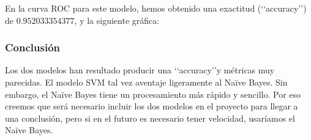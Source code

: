 En la curva ROC para este modelo, hemos obtenido
una exactitud (\lq\lq accuracy\rq\rq)
de $0.952033354377$, y la siguiente gráfica:


\subsubsection{Conclusión}

Los dos modelos han resultado producir una \lq\lq accuracy\rq\rq y métricas muy parecidas. El modelo SVM tal vez aventaje ligeramente al Naïve Bayes. Sin embargo, el Naïve Bayes tiene un procesamiento más rápido y sencillo. Por eso creemos que será necesario incluir los dos modelos en el proyecto para llegar a una conclusión, pero si en el futuro es necesario tener velocidad, usaríamos el Naïve Bayes.
